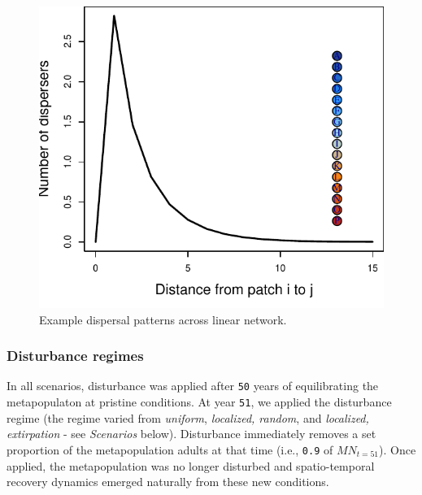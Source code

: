 \documentclass[]{article}
\begin{document}
\begin{figure}[H]

{\centering \includegraphics{Managing_for_ecological_surprises_in_metapopulations_files/figure-latex/dispersal-1} 

}

\caption{Example dispersal patterns across linear network.}\label{fig:dispersal}
\end{figure}

\hypertarget{disturbance-regimes}{%
\subsubsection{Disturbance regimes}\label{disturbance-regimes}}

In all scenarios, disturbance was applied after \texttt{50} years of
equilibrating the metapopulaton at pristine conditions. At year
\texttt{51}, we applied the disturbance regime (the regime varied from
\emph{uniform}, \emph{localized, random}, and \emph{localized,
extirpation} - see \emph{Scenarios} below). Disturbance immediately
removes a set proportion of the metapopulation adults at that time
(i.e., \texttt{0.9} of \(MN_{t=51}\)). Once applied, the metapopulation
was no longer disturbed and spatio-temporal recovery dynamics emerged
naturally from these new conditions.
\end{document}
